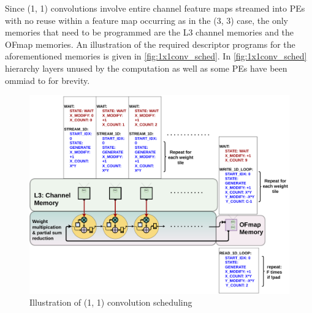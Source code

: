 Since (1, 1) convolutions involve entire channel feature maps streamed into PEs
with no reuse within a feature map occurring as in the (3, 3) case, the only
memories that need to be programmed are the L3 channel memories and the OFmap
memories. An illustration of the required descriptor programs for the
aforementioned memories is given in \autoref{fig:1x1conv_sched}. In
\autoref{fig:1x1conv_sched} hierarchy layers unused by the computation 
as well as some PEs have been ommiad to for brevity.

\begin{figure}[ht]
    \centering
    \includegraphics[scale=0.495]{fig/1x1conv_sched.pdf}
    \caption{Illustration of (1, 1) convolution scheduling}
    \label{fig:1x1conv_sched}
\end{figure}

